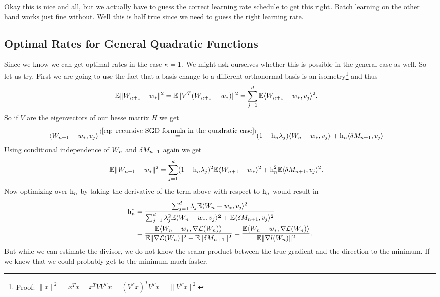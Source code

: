 Okay this is nice and all, but we actually have to guess the correct learning
rate schedule to get this right. Batch learning on the other hand works just
fine without. Well this is half true since we need to guess the right learning
rate.

\subsection{Optimal Rates for General Quadratic Functions}

Since we know we can get optimal rates in the case \(\kappa=1\). We might
ask ourselves whether this is possible in the general case as well. So let us
try. First we are going to use the fact that a basis change to a different
orthonormal basis is an isometry\footnote{
	Proof: \(\|x\|^2 = x^Tx = x^TVV^Tx = (V^T x)^T V^Tx = \|V^T x\|^2\)
}
and thus
\begin{align*}
	\mathbb{E}\|W_{n+1} - w_*\|^2
	&= \mathbb{E}\|V^T(W_{n+1} - w_*)\|^2
	= \sum_{j=1}^d \mathbb{E}\langle W_{n+1}-w_*, v_j\rangle^2.
\end{align*}
So if \(V\) are the eigenvectors of our hesse matrix \(H\) we get
\begin{align*}
	\langle \Weights_{n+1}-\minimum, v_j \rangle
	&\xeq{(\ref{eq: recursive SGD formula in the quadratic case})} (1-\lr_n\lambda_j)\langle\Weights_n-\minimum, v_j\rangle
	+ \lr_n\langle\martIncr_{n+1},v_j\rangle
\end{align*}
Using conditional independence of \(W_n\) and \(\delta M_{n+1}\) again we get
\begin{align}
	\label{eq: expected square error in quadratic case}
	\mathbb{E}\|W_{n+1} - w_*\|^2
	&= \sum_{j=1}^d (1-\text{h}_n \lambda_j)^2 \mathbb{E}\langle W_{n+1}-w_*\rangle^2
	+ \text{h}_n^2 \mathbb{E}\langle \delta M_{n+1}, v_j\rangle^2.
\end{align}
Now optimizing over \(\text{h}_n\) by taking the derivative of the term above with
respect to \(\text{h}_n\) would result in
\begin{align*}
	\text{h}_n^* &= \frac{
		\sum_{j=1}^d \lambda_j \mathbb{E}\langle W_n-w_*, v_j\rangle^2
	}{
		\sum_{j=1}^d\lambda_j^2\mathbb{E}\langle W_n-w_*, v_j\rangle^2
		+ \mathbb{E}\langle\delta M_{n+1}, v_j\rangle^2
	}\\
	&= \frac{
		\mathbb{E}\langle W_n - w_*, \nabla\mathcal{L}(W_n)\rangle
	}{
		\mathbb{E}\|\nabla\mathcal{L}(W_n)\|^2 + \mathbb{E}\|\delta M_{n+1}\|^2
	}
	= \frac{
		\mathbb{E}\langle W_n - w_*, \nabla\mathcal{L}(W_n)\rangle
	}{
		\mathbb{E}\|\nabla l(W_n)\|^2
	}.
\end{align*}
But while we can estimate the divisor, we do not know the scalar product between
the true gradient and the direction to the minimum. If we knew that we could
probably get to the minimum much faster.

